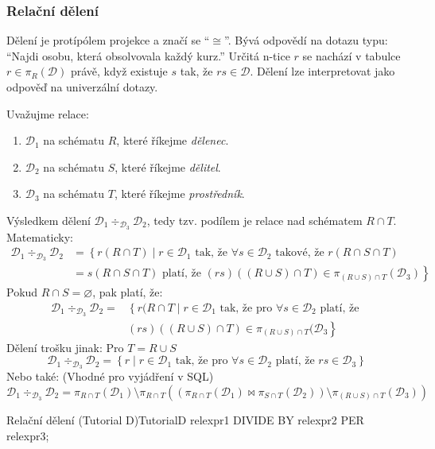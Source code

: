 \subsubsection{Relační dělení}
Dělení je protípólem projekce a značí se \enquote{$\cong$}. Bývá odpovědí na dotazu typu: \enquote{Najdi osobu, která obsolvovala každý kurz.} Určitá n-tice $r$ se nachází v tabulce $r \in \pi_{R} (\mathcal{D})$ právě, když existuje $s$ tak, že $rs \in \mathcal{D}$. Dělení lze interpretovat jako odpověď na univerzální dotazy.

Uvažujme relace:
\begin{enumerate}
\item $\mathcal{D}_{1}$ na schématu $R$, které říkejme \textit{dělenec}.
\item $\mathcal{D}_{2}$ na schématu $S$, které říkejme \textit{dělitel}.
\item $\mathcal{D}_{3}$ na schématu $T$, které říkejme \textit{prostředník}.
\end{enumerate}
Výsledkem dělení $\mathcal{D}_{1} \div_{\mathcal{D}_{3}} \mathcal{D}_{2}$, tedy tzv. podílem je relace nad schématem $R \cap T$. Matematicky:
\begin{align*}
\mathcal{D}_{1} \div_{\mathcal{D}_{3}} \mathcal{D}_{2} &= \left\{ r(R \cap T) \; | \; r \in \mathcal{D}_{1} \text{ tak, že } \forall s \in \mathcal{D}_{2} \text{ takové, že } r(R \cap S \cap T) \right. \\
&\left.= s(R \cap S \cap T) \text{ platí, že } (rs) ((R \cup S) \cap T) \in \pi_{(R \cup S) \cap T} (\mathcal{D}_{3}) \right\}
\end{align*}
Pokud $R \cap S = \varnothing$, pak platí, že:
\begin{align*}
\mathcal{D}_{1} \div_{\mathcal{D}_{3}} \mathcal{D}_{2} = &\left\{ r(R \cap T \; | \;  r \in \mathcal{D}_{1} \text{ tak, že pro } \forall s \in \mathcal{D}_{2}  \text{ platí, že } \right. \\
&\left.(rs) \left( \left(R \cup S\right) \cap T\right) \in \pi_{(R \cup S) \cap T} (\mathcal{D}_{3} \right\}
\end{align*}
Dělení trošku jinak: Pro $ T = R \cup S$ 
$$
\mathcal{D}_{1} \div_{\mathcal{D}_{3}} \mathcal{D}_{2} = \left\{ r \; | \; r \in \mathcal{D}_{1} \text{ tak, že pro } \forall s \in \mathcal{D}_{2} \text{ platí, že } rs \in \mathcal{D}_{3} \right\}
$$
Nebo také: (Vhodné pro vyjádření v SQL)
$$
\mathcal{D}_{1} \div_{\mathcal{D}_{3}} \mathcal{D}_{2} = \pi_{R \cap T} \left( \mathcal{D}_{1} \right) \setminus \pi_{R \cap T} \left( \left( \pi_{R \cap T} \left( \mathcal{D}_{1} \right) \Join \pi_{S \cap T} \left( \mathcal{D}_{2} \right) \right) \setminus \pi_{(R \cup S) \cap T} \left( \mathcal{D}_{3}  \right) \right) %
$$
\begin{upcode}{Relační dělení (Tutorial D)}{}{TutorialD}
relexpr1 DIVIDE BY relexpr2 PER relexpr3;
\end{upcode}


